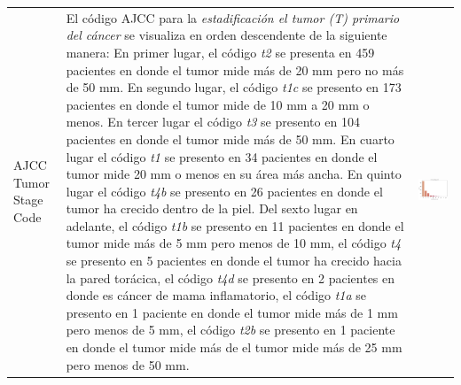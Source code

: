 \begin{table}[!htb]
	\footnotesize
	\begin{threeparttable}
		\begin{tabular}{p{2.5cm} p{7.5cm} p{6.5cm}} \toprule
			AJCC Tumor Stage Code 
			& El código AJCC para la \textit{estadificación el tumor (T) primario del cáncer} se visualiza en orden descendente de la siguiente manera: En primer lugar, el código \textit{t2} se presenta en 459 pacientes en donde el tumor mide más de 20 mm pero no más de 50 mm. En segundo lugar, el código \textit{t1c} se presento en 173 pacientes en donde el tumor mide  de 10 mm a 20 mm o menos. En tercer lugar el código \textit{t3} se presento en 104 pacientes en donde el tumor mide más de 50 mm. En cuarto lugar el código \textit{t1} se presento en 34 pacientes en donde el tumor  mide 20 mm o menos en su área más ancha. En quinto lugar el código \textit{t4b} se presento en 26 pacientes en donde el tumor ha crecido dentro de la piel. Del sexto lugar en adelante, el código \textit{t1b} se presento en 11 pacientes en donde el tumor mide más de 5 mm pero menos de 10 mm, el código \textit{t4} se presento en 5 pacientes en donde el tumor ha crecido hacia la pared torácica, el código \textit{t4d} se presento en 2 pacientes en donde es cáncer de mama inflamatorio, el código \textit{t1a} se presento en 1 paciente en donde el tumor mide más de 1 mm pero menos de 5 mm, el código \textit{t2b} se presento en 1 paciente en donde el tumor mide más de el tumor mide más de 25 mm pero menos de 50 mm.
			& \begin{center}\includegraphics[width=1\linewidth]{NOTEBOOK/IMAGENES_DESCRIPTIVAS/5_tumor_stage_code}\end{center}

\end{tabular}
\end{threeparttable}
\end{table}
